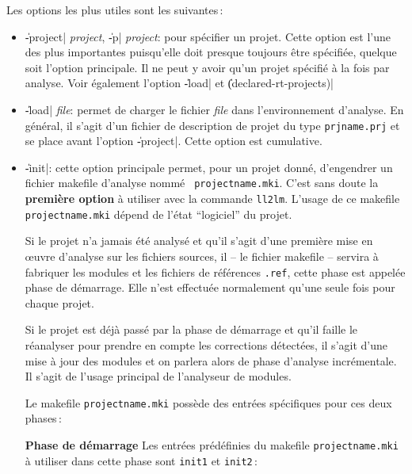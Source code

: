 Les options les plus utiles sont les suivantes\,:
\begin{itemize}

\item {\Large \|-project| {\em project}, \|-p| {\em project}}:
pour sp\'{e}cifier un projet.
Cette option est l'une des plus importantes
puisqu'elle doit presque toujours \^{e}tre sp\'{e}cifi\'{e}e, quelque soit
l'option principale. Il ne peut y avoir qu'un projet sp\'{e}cifi\'{e} \`{a} la
fois par analyse.
Voir \'{e}galement l'option \|-load| et
\|(declared-rt-projects)| 

\item {\Large \|-load| {\em file}}: permet de charger le fichier {\em file}
dans l'environnement d'analyse. En g\'{e}n\'{e}ral, il s'agit d'un fichier
de description de projet du type {\tt prjname.prj} et se place avant
l'option \|-project|. 
Cette option est cumulative.

\item {\Large \|-init|}: cette option principale permet, pour un
projet donn\'{e}, d'engendrer un fichier makefile d'analyse nomm\'{e} {\tt
projectname.mki}. 
C'est sans doute la {\bf premi\`{e}re option} \`{a} utiliser avec la
commande {\tt ll2lm}. 
L'usage de ce makefile {\tt projectname.mki} d\'{e}pend de l'\'{e}tat ``logiciel''
du projet.

Si le projet n'a jamais \'{e}t\'{e} analys\'{e} et qu'il s'agit d'une premi\`{e}re
mise en \oe uvre d'analyse sur les fichiers sources, il -- le fichier
makefile --  servira \`{a} fabriquer les  modules et les fichiers de
r\'{e}f\'{e}rences {\tt *.ref}, cette phase est 
appel\'{e}e phase de d\'{e}marrage. Elle n'est effectu\'{e}e normalement qu'une
seule fois pour chaque projet.

Si le projet est d\'{e}j\`{a} pass\'{e} par la phase de d\'{e}marrage et qu'il
faille le r\'{e}analyser pour prendre en compte les corrections
d\'{e}tect\'{e}es, il s'agit d'une mise \`{a} jour des modules et on parlera
alors de phase d'analyse incr\'{e}mentale. Il s'agit de l'usage principal de
l'analyseur de modules.

Le makefile {\tt projectname.mki} poss\`{e}de des entr\'{e}es sp\'{e}cifiques
pour ces deux phases\,:

\begin{Side}{\bf Phase de d\'{e}marrage}
Les entr\'{e}es pr\'{e}d\'{e}finies du makefile {\tt projectname.mki} \`{a}
utiliser dans cette phase sont {\tt init1} et {\tt init2}\,:
\end{Side}


\end{itemize}
